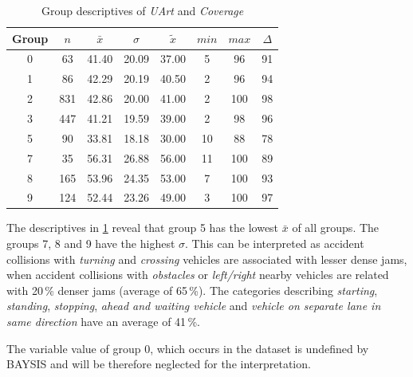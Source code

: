 \begin{table}[ht!]
	\tiny
	\centering
	\begin{tabular}{c|c|c|c|c|c|c|c}
		\toprule
		Group & $n$ & $\bar{x}$ & $\sigma$ & $\tilde{x}$ & $min$ & $max$ & $\Delta$ \\ 
		\midrule
		0 & 63  & 41.40 & 20.09 & 37.00 & 5  & 96  & 91 \\ 
		1 & 86  & 42.29 & 20.19 & 40.50 & 2  & 96  & 94 \\ 
		2 & 831 & 42.86 & 20.00 & 41.00 & 2  & 100 & 98 \\ 
		3 & 447 & 41.21 & 19.59 & 39.00 & 2  & 98  & 96 \\  
		5 & 90  & 33.81 & 18.18 & 30.00 & 10 & 88  & 78 \\ 
		7 & 35  & 56.31 & 26.88 & 56.00 & 11 & 100 & 89 \\ 
		8 & 165 & 53.96 & 24.35 & 53.00 & 7  & 100 & 93 \\ 
		9 & 124 & 52.44 & 23.26 & 49.00 & 3  & 100 & 97 \\ 
		\bottomrule
	\end{tabular}
	\caption{Group descriptives of \textit{UArt} and \textit{Coverage}}
	\label{tbl:descriptives_baysis_matched_UArt_Cov}
\end{table}
The descriptives in \cref{tbl:descriptives_baysis_matched_UArt_Cov} reveal that group 5 has the lowest $\bar{x}$ of all groups. The groups 7, 8 and 9 have the highest $\sigma$. This can be interpreted as accident collisions with \textit{turning} and \textit{crossing} vehicles are associated with lesser dense jams, when accident collisions with \textit{obstacles} or \textit{left/right} nearby vehicles are related with 20\,\% denser jams (average of 65\,\%). The categories describing \textit{starting}, \textit{standing}, \textit{stopping}, \textit{ahead and waiting vehicle} and \textit{vehicle on separate lane in same direction} have an average of 41\,\%.


 The variable value of group 0, which occurs in the dataset is undefined by BAYSIS and will be therefore neglected for the interpretation.  

